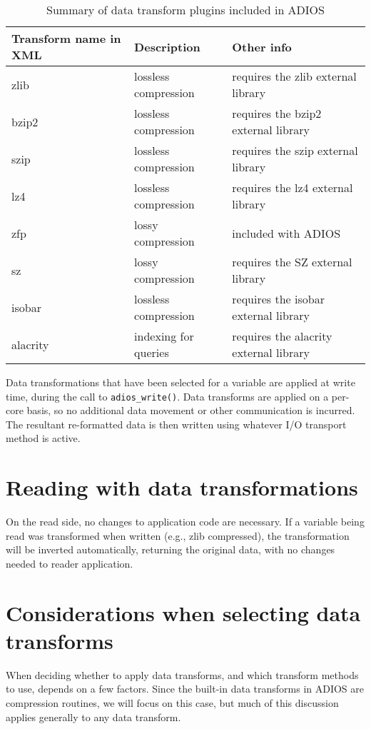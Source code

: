 \begin{table}%
\begin{tabular}{l|l|l}
\textbf{Transform name in XML} & \textbf{Description} & \textbf{Other info} \\
\hline
zlib & lossless compression & requires the zlib external library \\
\hline
bzip2 & lossless compression & requires the bzip2 external library \\
\hline
szip & lossless compression & requires the szip external library \\
\hline
lz4 & lossless compression & requires the lz4 external library \\
\hline
zfp & lossy compression & included with ADIOS \\
\hline
sz & lossy compression & requires the SZ external library \\
\hline
isobar & lossless compression & requires the isobar external library \\
\hline
alacrity & indexing for queries & requires the alacrity external library \\
\end{tabular}
\caption{Summary of data transform plugins included in ADIOS}
\label{tbl:data-transforms-summary}
\end{table}

Data transformations that have been selected for a variable are applied at write time, during the call to \verb+adios_write()+.
Data transforms are applied on a per-core basis, so no additional data movement or other communication is incurred.
The resultant re-formatted data is then written using whatever I/O transport method is active.

\section{Reading with data transformations}
On the read side, no changes to application code are necessary. If a variable being read was transformed when written
(e.g., zlib compressed), the transformation will be inverted automatically, returning the original data,
with no changes needed to reader application.

\section{Considerations when selecting data transforms}
When deciding whether to apply data transforms, and which transform methods to use, depends on a few factors.
Since the built-in data transforms in ADIOS are compression routines, we will focus on this case, but much of
this discussion applies generally to any data transform.

